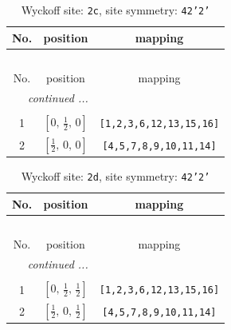 \documentclass[fleqn,8pt]{jsarticle}
\begin{document}
\renewcommand{\arraystretch}{1.2}
\begin{longtable}{ccc}
\caption{Wyckoff site: {\tt 2c}, site symmetry: {\tt 42'2'}}
 \\
 \hline \hline
No. & position & mapping \\ \hline \endfirsthead

\multicolumn{2}{l}{\tablename\ \thetable{}} \\
 \hline \hline
No. & position & mapping \\ \hline \endhead

 \hline \hline
\multicolumn{2}{r}{\footnotesize\it continued ...} \\ \endfoot

 \hline \hline
\multicolumn{2}{r}{} \\ \endlastfoot

1 & $\left[ 0,\, \frac{1}{2},\, 0 \right]$ & {\tt [1,2,3,6,12,13,15,16]} \\ \hline
2 & $\left[ \frac{1}{2},\, 0,\, 0 \right]$ & {\tt [4,5,7,8,9,10,11,14]} \\
\end{longtable}
\renewcommand{\arraystretch}{1.2}
\begin{longtable}{ccc}
\caption{Wyckoff site: {\tt 2d}, site symmetry: {\tt 42'2'}}
 \\
 \hline \hline
No. & position & mapping \\ \hline \endfirsthead

\multicolumn{2}{l}{\tablename\ \thetable{}} \\
 \hline \hline
No. & position & mapping \\ \hline \endhead

 \hline \hline
\multicolumn{2}{r}{\footnotesize\it continued ...} \\ \endfoot

 \hline \hline
\multicolumn{2}{r}{} \\ \endlastfoot

1 & $\left[ 0,\, \frac{1}{2},\, \frac{1}{2} \right]$ & {\tt [1,2,3,6,12,13,15,16]} \\ \hline
2 & $\left[ \frac{1}{2},\, 0,\, \frac{1}{2} \right]$ & {\tt [4,5,7,8,9,10,11,14]} \\
\end{longtable}
\renewcommand{\arraystretch}{1.2}
\end{document}
